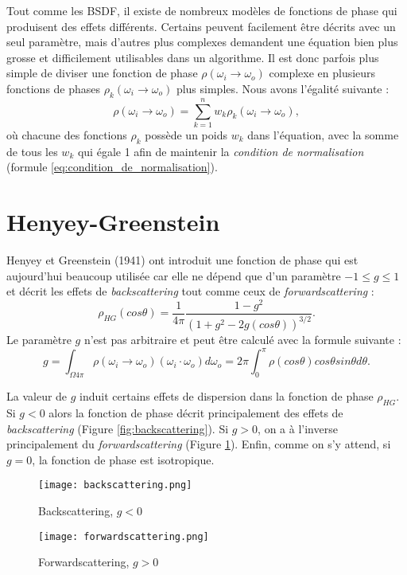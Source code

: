 Tout comme les BSDF, il existe de nombreux modèles de fonctions de phase qui produisent des effets différents. Certains peuvent facilement être décrits avec un seul paramètre, mais d'autres plus complexes demandent une équation bien plus grosse et difficilement utilisables dans un algorithme. Il est donc parfois plus simple de diviser une fonction de phase $\rho(\omega_{i}\longrightarrow\omega_{o})$ complexe en plusieurs fonctions de phases $\rho_{k}(\omega_{i}\longrightarrow\omega_{o})$ plus simples. Nous avons l'égalité suivante :
\large \begin{equation}\label{eq:fp_somme}
    \rho(\omega_{i}\longrightarrow\omega_{o}) = \sum\limits_{k=1}^n w_{k}\rho_{k}(\omega_{i}\longrightarrow\omega_{o})
,\end{equation} \normalsize
où chacune des fonctions $\rho_{k}$ possède un poids $w_{k}$ dans l'équation, avec la somme de tous les $w_{k}$ qui égale 1 afin de maintenir la \textit{condition de normalisation} (formule \ref{eq:condition_de_normalisation}).


\section{Henyey-Greenstein}
\label{explication_parametre_g}

Henyey et Greenstein (1941) ont introduit une fonction de phase qui est aujourd'hui beaucoup utilisée car elle ne dépend que d'un paramètre $-1 \leq g \leq 1$ et décrit les effets de \textit{backscattering} tout comme ceux de \textit{forwardscattering} :
\large
$$\rho_{HG}(cos\theta) = \frac{1}{4\pi} \frac{1-g^2}{(1+g^2-2g(cos\theta))^{3/2}}.$$
\normalsize
Le paramètre $g$ n'est pas arbitraire et peut être calculé avec la formule suivante :
\large
$$g = \int_{\Omega4\pi}\rho(\omega_{i}\longrightarrow\omega_{o})(\omega_{i}\cdot\omega_{o})d\omega_{o} = 2\pi\int_{0}^{\pi}\rho(cos\theta)cos\theta sin\theta d\theta.$$
\normalsize
\par
La valeur de $g$ induit certains effets de dispersion dans la fonction de phase $\rho_{HG}$. Si $g<0$ alors la fonction de phase décrit principalement des effets de \textit{backscattering} (Figure \ref{fig:backscattering}). Si $g>0$, on a à l'inverse principalement du \textit{forwardscattering} (Figure \ref{fig:forwardscattering}). Enfin, comme on s'y attend, si $g=0$, la fonction de phase est isotropique.\newline\par

\begin{figure}
   \begin{minipage}[c]{.46\linewidth}
      \texttt{[image: backscattering.png]}
      \caption{Backscattering, $g<0$}
      \label{fig:backscattering}
   \end{minipage} \hfill
   \begin{minipage}[c]{.46\linewidth}
      \texttt{[image: forwardscattering.png]}
      \caption{Forwardscattering, $g>0$}
      \label{fig:forwardscattering}
   \end{minipage}
\end{figure}

